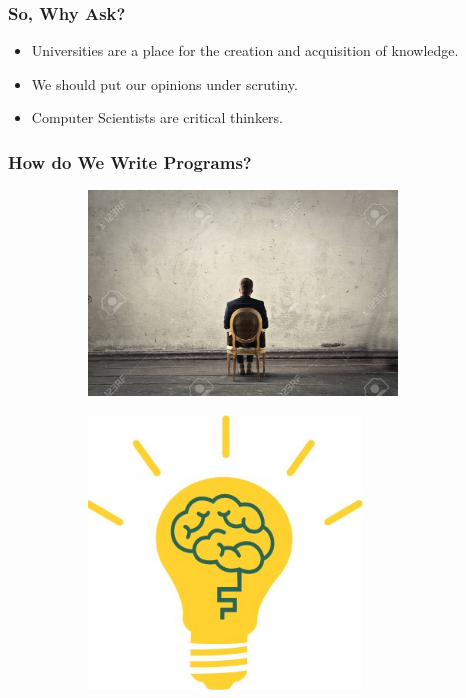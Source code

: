\documentclass{beamer}
\begin{document}
\begin{frame}
  \frametitle{So, Why Ask?}
  \begin{itemize}
  \item<1-> Universities are a place for the creation and acquisition of knowledge.
  \item<2-> We should put our opinions under scrutiny.
  \item<3-> Computer Scientists are critical thinkers.
  \end{itemize}
\end{frame}

\begin{frame}
  \frametitle{How do We Write Programs?}
  \begin{figure}
    \begin{subfigure}[b]{0.4\textwidth}
      \includegraphics[width=0.9\textwidth]{images/staring-at-a-blank-wall.jpg}
    \end{subfigure}
    \pause
    \begin{subfigure}[b]{0.4\textwidth}
      \includegraphics[width=0.8\textwidth]{images/eureka.jpg}
    \end{subfigure}
  \end{figure}
\end{frame}
\end{document}
